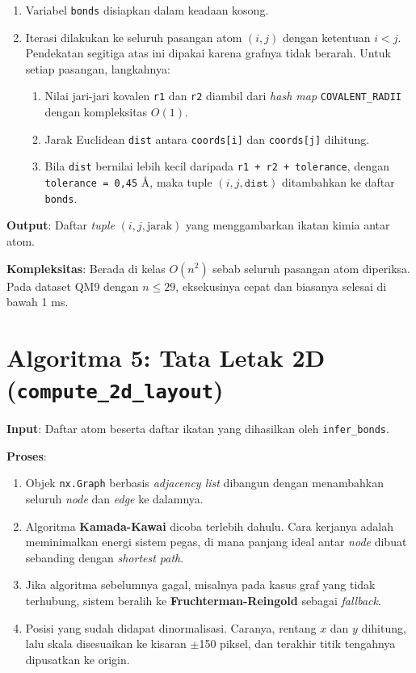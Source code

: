 \documentclass[a4paper,12pt]{report}
\begin{document}
\begin{enumerate}
    \item Variabel \texttt{bonds} disiapkan dalam keadaan kosong.
    \item Iterasi dilakukan ke seluruh pasangan atom $(i, j)$ dengan ketentuan $i < j$. Pendekatan segitiga atas ini dipakai karena grafnya tidak berarah. Untuk setiap pasangan, langkahnya:
    \begin{enumerate}
        \item Nilai jari-jari kovalen \texttt{r1} dan \texttt{r2} diambil dari \textit{hash map} \texttt{COVALENT\_RADII} dengan kompleksitas $O(1)$.
        \item Jarak Euclidean \texttt{dist} antara \texttt{coords[i]} dan \texttt{coords[j]} dihitung.
        \item Bila \texttt{dist} bernilai lebih kecil daripada \texttt{r1 + r2 + tolerance}, dengan \texttt{tolerance = 0{,}45} Å, maka tuple $(i, j, \texttt{dist})$ ditambahkan ke daftar \texttt{bonds}.
    \end{enumerate}
\end{enumerate}

\textbf{Output}: Daftar \textit{tuple} $(i, j, \text{jarak})$ yang menggambarkan ikatan kimia antar atom.

\textbf{Kompleksitas}: Berada di kelas $O(n^2)$ sebab seluruh pasangan atom diperiksa. Pada dataset QM9 dengan $n \leq 29$, eksekusinya cepat dan biasanya selesai di bawah 1 ms.

\section{Algoritma 5: Tata Letak 2D (\texttt{compute\_2d\_layout})}

\textbf{Input}: Daftar atom beserta daftar ikatan yang dihasilkan oleh \texttt{infer\_bonds}.

\textbf{Proses}:

\begin{enumerate}
    \item Objek \texttt{nx.Graph} berbasis \textit{adjacency list} dibangun dengan menambahkan seluruh \textit{node} dan \textit{edge} ke dalamnya.
    \item Algoritma \textbf{Kamada-Kawai} dicoba terlebih dahulu. Cara kerjanya adalah meminimalkan energi sistem pegas, di mana panjang ideal antar \textit{node} dibuat sebanding dengan \textit{shortest path}.
    \item Jika algoritma sebelumnya gagal, misalnya pada kasus graf yang tidak terhubung, sistem beralih ke \textbf{Fruchterman-Reingold} sebagai \textit{fallback}.
    \item Posisi yang sudah didapat dinormalisasi. Caranya, rentang $x$ dan $y$ dihitung, lalu skala disesuaikan ke kisaran $\pm$150 piksel, dan terakhir titik tengahnya dipusatkan ke origin.
\end{enumerate}
\end{document}
